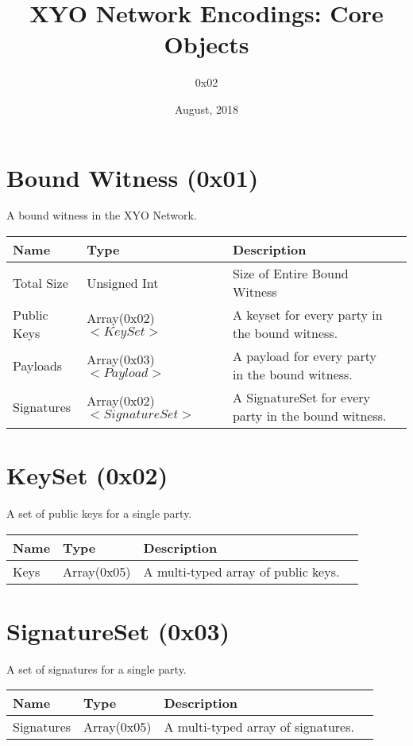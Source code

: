 \documentclass[11pt]{article}
\title{XYO Network Encodings: Core Objects}
\author{0x02}
\date{August, 2018}
\begin{document}
\maketitle

\section{Bound Witness (0x01)}
A bound witness in the XYO Network.

\begin{center}
\begin{tabular}{ |l|l|l|l| } 
\hline
\textbf{Name} & \textbf{Type} & \textbf{Description}\\
\hline
Total Size & Unsigned Int & Size of Entire Bound Witness\\  
Public Keys & Array(0x02)$<KeySet>$ & A keyset for every party in the bound witness. \\  
Payloads & Array(0x03)$<Payload>$  & A payload for every party in the bound witness.\\  
Signatures & Array(0x02)$<SignatureSet>$ & A SignatureSet for every party in the bound witness.\\  
 
\hline
\end{tabular}
\end{center}

\section{KeySet (0x02)}
A set of public keys for a single party.
\begin{center}
\begin{tabular}{ |l|l|l|l| } 
\hline
\textbf{Name} & \textbf{Type} & \textbf{Description}\\
\hline
Keys & Array(0x05) & A multi-typed array of public keys.\\  
 
\hline
\end{tabular}
\end{center}

\section{SignatureSet (0x03)}
A set of signatures for a single party.
\begin{center}
\begin{tabular}{ |l|l|l|l| } 
\hline
\textbf{Name} & \textbf{Type} & \textbf{Description}\\
\hline
Signatures & Array(0x05) & A multi-typed array of signatures.\\  
 
\hline
\end{tabular}
\end{center}
\end{document}
